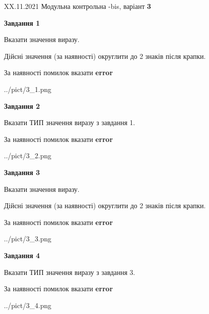 \documentclass[11pt, ukrainian]{article}
\begin{document}
{XX.11.2021 Модульна контрольна -bis, варіант  \No \textbf { 3 }\par}
{
\begin {large}
{\begin {center}\textbf{Завдання 1}\end {center}}\par
Вказати значення виразу. \par
Дійсні значення (за наявності) округлити до 2 знаків після крапки. \par
За наявності помилок вказати \textbf{error}

\begin{center}
	{../pict/3_1.png}
\end{center}
\newpage

{\begin {center}\textbf{Завдання 2}\end {center}}\par
Вказати ТИП значення виразу з завдання 1. \par
За наявності помилок вказати \textbf{error}

\begin{center}
	{../pict/3_2.png}
\end{center}
\newpage

{\begin {center}\textbf{Завдання 3}\end {center}}\par
Вказати значення виразу. \par
Дійсні значення (за наявності) округлити до 2 знаків після крапки. \par
За наявності помилок вказати \textbf{error}

\begin{center}
	{../pict/3_3.png}
\end{center}
\newpage

{\begin {center}\textbf{Завдання 4}\end {center}}\par
Вказати ТИП значення виразу з завдання 3. \par
За наявності помилок вказати \textbf{error}

\begin{center}
	{../pict/3_4.png}
\end{center}
\newpage


\end{large}}
\end{document}
